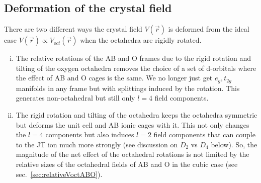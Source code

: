 \documentclass[a4paper,prb,twocolumn]{revtex4-1}  %
\newcommand{\com}[1]{}
\newcommand{\az}[1]{{\color{magenta}{#1}}} %
\begin{document}
\com{
\begin{align}
\vec a_1 & =  \cos\beta ( 1,1,0 ) ,\\
\vec a_2 & =  \cos\alpha  \cos\beta(-1,1,0 ),\\
\vec a_3 & =  \cos\alpha ( 0,0,2 ).
\end{align}
}





\subsection{Deformation of the crystal field}
\label{sec:deformCF}


\com{Before we present calculations and results, let's briefly
summarise the contribution of the AB cages towards the crystal field Hamiltonian
....}
 
There are two different ways the crystal field $V(\vec r)$
\az{[at the location of a B ion... which B ion out of four in distorted structure?... pick one here...]}
 is deformed from the ideal case $V(\vec r) \propto V_{oct}(\vec r)$
 when the octahedra are rigidly rotated. 
\begin{enumerate}[(i)]
\item
The relative rotations of the AB and O frames due to
the rigid rotation and tilting of the oxygen octahedra removes the
choice of a set of d-orbitals where the effect of 
AB and O cages is the same. 
We no longer just get $e_g, t_{2g}$ manifolds in any frame but with splittings induced by the rotation.
This generates non-octahedral but still only $l=4$ field components. 
\item
The rigid rotation and tilting of the octahedra keeps the octahedra symmetric but deforms the unit cell and AB ionic cages with it.
This not only changes the $l=4$ components but also induces 
$l=2$ field components
that can couple to the JT ion much more strongly (see discussion on $D_2$ vs $D_4$ below).
So, the magnitude of the net effect of the octahedral rotations is not limited by the relative sizes of the octahedral fields of AB and O in the cubic case (see sec.~\ref{sec:relativeVoctABO}).
\end{enumerate}
\end{document}
